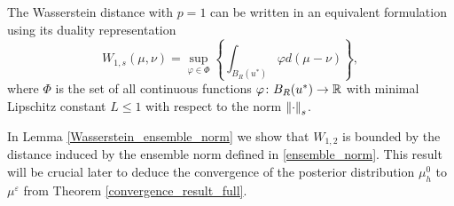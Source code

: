 \documentclass[10pt]{article}
\begin{document}
\begin{remark}
The Wasserstein distance with $p = 1$ can be written in an equivalent formulation using its duality representation
\begin{equation}
\label{Wasserstein_dual}
W_{1,s}(\mu, \nu) = \sup_{\varphi \in \Phi} \left \{ \int_{B_R(u^*)} \varphi d(\mu - \nu) \right \},
\end{equation}
where $\Phi$ is the set of all continuous functions $\varphi \colon B_R(u^*) \to \mathbb{R}$ with minimal Lipschitz constant $L \le 1$ with respect to the norm $\left\|\cdot\right\|_s$.
\end{remark}

In Lemma \ref{Wasserstein_ensemble_norm} we show that $W_{1,2}$ is bounded by the distance induced by the ensemble norm defined in \ref{ensemble_norm}. This result will be crucial later to deduce the convergence of the posterior distribution $\mu_h^0$ to $\mu^{\varepsilon}$ from Theorem \ref{convergence_result_full}.
\end{document}
